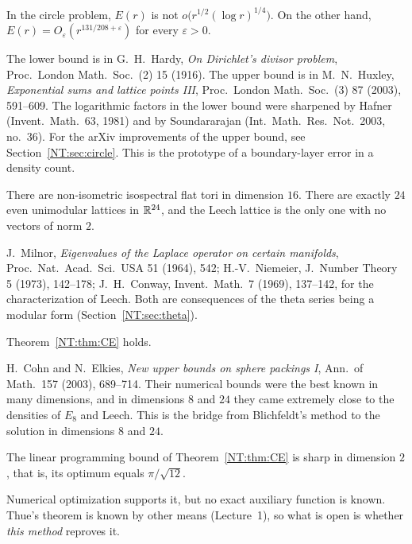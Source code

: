 \begin{theorem}\label{NT:gal:circle}
In the circle problem, $E(r)$ is not $o\big(r^{1/2}(\log r)^{1/4}\big)$. On the other hand,
$E(r)=O_\varepsilon(r^{131/208+\varepsilon})$ for every $\varepsilon>0$.
\end{theorem}
The lower bound is in G.~H.~Hardy, \emph{On Dirichlet's divisor problem}, Proc.\ London Math.\ Soc.\ (2)
15 (1916). The upper bound is in M.~N.~Huxley, \emph{Exponential sums and lattice points III}, Proc.\
London Math.\ Soc.\ (3) 87 (2003), 591--609. The logarithmic factors in the lower bound were sharpened
by Hafner (Invent.\ Math.\ 63, 1981) and by Soundararajan (Int.\ Math.\ Res.\ Not.\ 2003, no.~36). For
the arXiv improvements of the upper bound, see Section~\ref{NT:sec:circle}. This is the prototype of a boundary-layer error in a density count.

\begin{theorem}\label{NT:gal:niemeier}
There are non-isometric isospectral flat tori in dimension $16$. There are exactly $24$ even unimodular
lattices in $\mathbb{R}^{24}$, and the Leech lattice is the only one with no vectors of norm $2$.
\end{theorem}
J.~Milnor, \emph{Eigenvalues of the Laplace operator on certain manifolds}, Proc.\ Nat.\ Acad.\ Sci.\
USA 51 (1964), 542; H.-V.~Niemeier, J.\ Number Theory 5 (1973), 142--178; J.~H.~Conway, Invent.\ Math.\ 7
(1969), 137--142, for the characterization of Leech. Both are consequences of the theta series being a
modular form (Section~\ref{NT:sec:theta}).

\begin{theorem}\label{NT:gal:CE}
Theorem~\ref{NT:thm:CE} holds.
\end{theorem}
H.~Cohn and N.~Elkies, \emph{New upper bounds on sphere packings I}, Ann.\ of Math.\ 157 (2003), 689--714.
Their numerical bounds were the best known in many dimensions, and in dimensions $8$ and $24$ they came
extremely close to the densities of $E_8$ and Leech. This is the bridge from Blichfeldt's method to the solution in dimensions $8$ and $24$.

\begin{conjecture}[Cohn--Elkies]\label{NT:gal:CE2}
The linear programming bound of Theorem~\ref{NT:thm:CE} is sharp in dimension $2$, that is, its optimum
equals $\pi/\sqrt{12}$.
\end{conjecture}
Numerical optimization supports it, but no exact auxiliary function is known. Thue's
theorem is known by other means (Lecture~1), so what is open is whether \emph{this method} reproves it.

